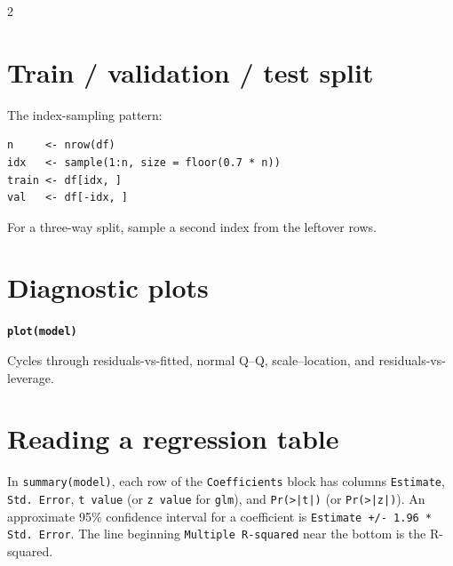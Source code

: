 \documentclass[10pt]{article}
\newcommand{\entry}[2]{%
  \par\medskip\noindent\textbf{\texttt{#1}}\par%
  \hspace*{1.5em}\parbox[t]{\dimexpr\linewidth-1.5em}{#2}\par%
}
\begin{document}
\begin{multicols}{2}
\section*{Train / validation / test split}

The index-sampling pattern:

\begin{verbatim}
n     <- nrow(df)
idx   <- sample(1:n, size = floor(0.7 * n))
train <- df[idx, ]
val   <- df[-idx, ]
\end{verbatim}

For a three-way split, sample a second index from the leftover rows.

\section*{Diagnostic plots}
\entry{plot(model)}{Cycles through residuals-vs-fitted, normal Q--Q, scale--location, and residuals-vs-leverage.}

\section*{Reading a regression table}

In \texttt{summary(model)}, each row of the \texttt{Coefficients} block has columns \texttt{Estimate}, \texttt{Std. Error}, \texttt{t value} (or \texttt{z value} for \texttt{glm}), and \texttt{Pr(>|t|)} (or \texttt{Pr(>|z|)}). An approximate 95\% confidence interval for a coefficient is \texttt{Estimate +/- 1.96 * Std. Error}. The line beginning \texttt{Multiple R-squared} near the bottom is the R-squared.

\end{multicols}
\end{document}
